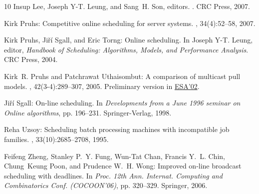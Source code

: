 \begin{thebibliography}{10}
{\sc Insup Lee, Joseph Y-T. Leung, and Sang~H. Son}, editors.
.
\newblock CRC Press, 2007.
\newblock [\epfmtdoi{10.1201/9781420011746}]

{\sc Kirk Pruhs}: Competitive online scheduling for server systems.
, 34(4):52--58, 2007.
\newblock [\epfmtdoi{10.1145/1243401.1243411}]

{\sc Kirk Pruhs, Ji\v{r}\'{i} Sgall, and Eric Torng}: Online scheduling.
\newblock In {\sc Joseph Y-T. Leung}, editor, {\em Handbook of Scheduling:
  Algorithms, Models, and Performance Analysis}. CRC Press, 2004.

{\sc Kirk~R. Pruhs and Patchrawat Uthaisombut}: A comparison of multicast pull
  models.
, 42(3-4):289--307, 2005.
\newblock Preliminary version in
  \href{http://dx.doi.org/10.1007/3-540-45749-6\_70}{ESA'02}.
\newblock [\epfmtdoi{10.1007/s00453-005-1170-1}]

{\sc Ji\v{r}\'{i} Sgall}: On-line scheduling.
\newblock In {\em Developments from a June 1996 seminar on Online algorithms},
  pp. 196--231. Springer-Verlag, 1998.

{\sc Reha Uzsoy}: Scheduling batch processing machines with incompatible job
  families.
,
  33(10):2685--2708, 1995.
\newblock [\epfmtdoi{10.1080/00207549508904839}]

{\sc Feifeng Zheng, Stanley P.~Y. Fung, Wun-Tat Chan, Francis Y.~L. Chin,
  Chung~Keung Poon, and Prudence W.~H. Wong}: Improved on-line broadcast
  scheduling with deadlines.
\newblock In {\em Proc. 12th Ann. Internat. Computing and Combinatorics Conf.
  (COCOON'06)}, pp. 320--329. Springer, 2006.
\newblock [\epfmtdoi{10.1007/11809678\_34}]

\end{thebibliography}
